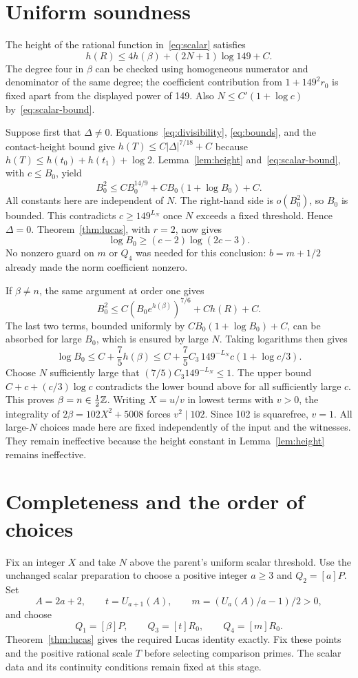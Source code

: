 \documentclass[11pt,a4paper]{article}
\begin{document}
\section{Uniform soundness}
The height of the rational function in~\eqref{eq:scalar} satisfies
\[
 h(R)\le4h(\beta)+(2N+1)\log149+C.
\]
The degree four in $\beta$ can be checked using homogeneous numerator
and denominator of the same degree; the coefficient contribution from
$1+149^2r_0$ is fixed apart from the displayed power of 149.
Also $N\le C'(1+\log c)$ by~\eqref{eq:scalar-bound}.

Suppose first that $\Delta\ne0$. Equations~\eqref{eq:divisibility},
\eqref{eq:bounds}, and the contact-height bound give
$h(T)\le C|\Delta|^{7/18}+C$ because
$h(T)\le h(t_0)+h(t_1)+\log2$.
Lemma~\ref{lem:height} and~\eqref{eq:scalar-bound}, with $c\le B_0$, yield
\[
 B_0^2\le C B_0^{14/9}+C B_0(1+\log B_0)+C.
\]
All constants here are independent of $N$. The right-hand side is
$o(B_0^2)$, so $B_0$ is bounded. This contradicts
$c\ge149^{L_N}$ once $N$ exceeds a fixed threshold. Hence $\Delta=0$.
Theorem~\ref{thm:lucas}, with $r=2$, now gives
\[
                 \log B_0\ge(c-2)\log(2c-3).
\]
No nonzero guard on $m$ or $Q_4$ was needed for this conclusion:
$b=m+1/2$ already made the norm coefficient nonzero.

If $\beta\ne n$, the same argument at order one gives
\[
 B_0^2\le C(B_0e^{h(\beta)})^{7/6}+C h(R)+C.
\]
The last two terms, bounded uniformly by $C B_0(1+\log B_0)+C$, can
be absorbed for large $B_0$, which is ensured by large $N$.
Taking logarithms then gives
\[
 \log B_0\le C+\frac75h(\beta)
 \le C+\frac75C_3\,149^{-L_N}c(1+\log c/3).
\]
Choose $N$ sufficiently large that $(7/5)C_3 149^{-L_N}\le1$.
The upper bound $C+c+(c/3)\log c$ contradicts the lower bound above
for all sufficiently large $c$. This proves $\beta=n\in\tfrac12\mathbb Z$.
Writing $X=u/v$ in lowest terms with $v>0$, the integrality of
$2\beta=102X^2+5008$ forces $v^2\mid102$. Since 102 is squarefree,
$v=1$. All large-$N$ choices made here are fixed independently of the
input and the witnesses. They remain ineffective because the height
constant in Lemma~\ref{lem:height} remains ineffective.

\section{Completeness and the order of choices}
Fix an integer $X$ and take $N$ above the parent's uniform scalar threshold.
Use the unchanged scalar preparation to choose a positive integer $a\ge3$
and $Q_2=[a]P$. Set
\[
 A=2a+2,\qquad t=U_{a+1}(A),\qquad
 m=(U_a(A)/a-1)/2>0,
\]
and choose
\[
 Q_1=[\beta]P,\qquad Q_3=[t]R_0,\qquad Q_4=[m]R_0.
\]
Theorem~\ref{thm:lucas} gives the required Lucas identity exactly.
Fix these points and the positive rational scale $T$ before selecting
comparison primes. The scalar data and its continuity conditions remain
fixed at this stage.
\end{document}
